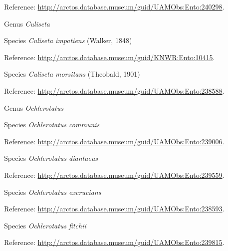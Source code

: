 \documentclass[9pt, article]{memoir}
\begin{document}
\begin{multicols}{2}
\vspace{6pt}Reference: 
\url{http://arctos.database.museum/guid/UAMObs:Ento:240298}.

\vspace{6pt}\noindent\hspace{30pt}Genus \textit{Culiseta}


\vspace{6pt}\noindent\hspace{36pt}Species \textit{Culiseta impatiens} (Walker, 1848)


\vspace{6pt}Reference: 
\url{http://arctos.database.museum/guid/KNWR:Ento:10415}.

\vspace{6pt}\noindent\hspace{36pt}Species \textit{Culiseta morsitans} (Theobald, 1901)


\vspace{6pt}Reference: 
\url{http://arctos.database.museum/guid/UAMObs:Ento:238588}.

\vspace{6pt}\noindent\hspace{30pt}Genus \textit{Ochlerotatus}


\vspace{6pt}\noindent\hspace{36pt}Species \textit{Ochlerotatus communis}


\vspace{6pt}Reference: 
\url{http://arctos.database.museum/guid/UAMObs:Ento:239006}.

\vspace{6pt}\noindent\hspace{36pt}Species \textit{Ochlerotatus diantaeus}


\vspace{6pt}Reference: 
\url{http://arctos.database.museum/guid/UAMObs:Ento:239559}.

\vspace{6pt}\noindent\hspace{36pt}Species \textit{Ochlerotatus excrucians}


\vspace{6pt}Reference: 
\url{http://arctos.database.museum/guid/UAMObs:Ento:238593}.

\vspace{6pt}\noindent\hspace{36pt}Species \textit{Ochlerotatus fitchii}


\vspace{6pt}Reference: 
\url{http://arctos.database.museum/guid/UAMObs:Ento:239815}.


\end{multicols}
\end{document}
